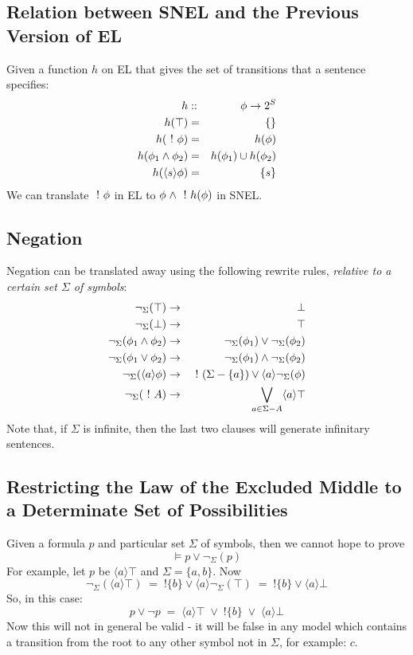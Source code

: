 \subsection{Relation between SNEL and the Previous Version of EL}
Given a function $h$ on EL that gives the set of transitions that a sentence specifies:
\begin{eqnarray}
h & :: & \phi \rightarrow 2^S \nonumber \\
h(\top) & = & \{ \} \nonumber \\
h(\ ! \  \phi) & = & h(\phi) \nonumber \\
h(\phi_1 \land \phi_2) & = & h(\phi_1) \cup h(\phi_2) \nonumber \\
h(\langle s \rangle \phi) & = & \{ s \} \nonumber
\end{eqnarray}
We can translate $\ ! \  \phi$ in EL to $\phi \; \land \; \ ! \  h(\phi)$ in SNEL.

\subsection{Negation}
Negation can be translated away using the following rewrite rules, \emph{relative to a certain set $\Sigma$ of symbols}:
\begin{eqnarray}
\neg_\Sigma(\top) & \rightarrow & \bot \nonumber \\
\neg_\Sigma(\bot) & \rightarrow & \top \nonumber \\
\neg_\Sigma(\phi_1 \land \phi_2) & \rightarrow & \neg_\Sigma(\phi_1) \lor \neg_\Sigma(\phi_2) \nonumber \\
\neg_\Sigma(\phi_1 \lor \phi_2) & \rightarrow & \neg_\Sigma(\phi_1) \land \neg_\Sigma(\phi_2) \nonumber \\
\neg_\Sigma(\langle a \rangle \phi) & \rightarrow & \ ! \ (\Sigma-\{a\}) \lor \langle a \rangle \neg_\Sigma(\phi) \nonumber \\
\neg_\Sigma(\ ! \  A) & \rightarrow & \bigvee_{a \in \Sigma - A} \langle a \rangle \top\nonumber
\end{eqnarray}
Note that, if $\Sigma$ is infinite, then the last two clauses will generate infinitary sentences.

\subsection{Restricting the Law of the Excluded Middle to a Determinate Set of Possibilities}
Given a formula $p$ and particular set $\Sigma$ of symbols, then we cannot hope to prove 
\[
\models p \lor \neg_\Sigma(p)
\]
For example, let $p$ be $\langle a \rangle \top$ and $\Sigma = \{a, b\}$.
Now
\[
\neg_\Sigma(\langle a \rangle \top) \; = \; ! \{b\} \lor \langle a \rangle \neg_\Sigma(\top) \; =  \; ! \{b\} \lor \langle a \rangle \bot
\]
So, in this case:
\[
p \lor \neg p \; = \; \langle a \rangle \top \; \lor \; ! \{b\} \; \lor \; \langle a \rangle \bot
\]
Now this will not in general be valid - it will be false in any model which contains a transition from the root to any other symbol not in $\Sigma$, for example: $c$.

